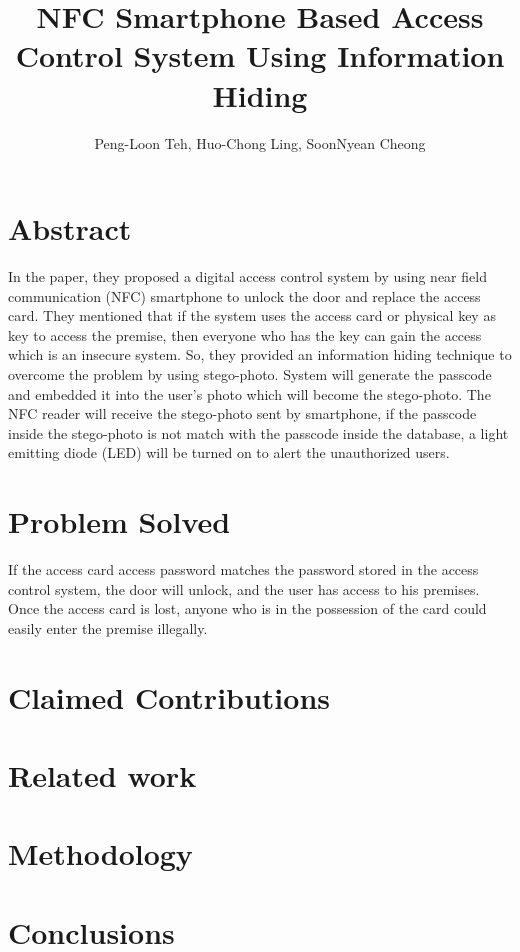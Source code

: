 \documentclass[•]{article}
\title{NFC Smartphone Based Access Control System Using Information Hiding}
\author{Peng-Loon Teh, Huo-Chong Ling, SoonNyean Cheong}
\date{}
\begin{document}

\tableofcontents
\maketitle

\section{Abstract}
\hspace{1cm}In the paper, they proposed a digital access control system by using near field communication (NFC) smartphone to unlock the door and replace the access card. They mentioned that if the system uses the access card or physical key as key to access the premise, then everyone who has the key can gain the access which is an insecure system. So, they provided an information hiding technique to overcome the problem by using stego-photo. System will generate the passcode and embedded it into the user’s photo which will become the stego-photo. The NFC reader will receive the stego-photo sent by smartphone, if the passcode inside the stego-photo is not match with the passcode inside the database, a light emitting diode (LED) will be turned on to alert the unauthorized users. ~\cite{Katzenbeisser2000}

\section{Problem Solved}
If the access card access password matches the password stored in the access control system, the door will unlock, and the user has access to his premises.
Once the access card is lost, anyone who is in the possession of the card could easily enter the premise illegally.

\section{Claimed Contributions}

\section{Related work}

\section{Methodology}

\section{Conclusions}


{}
\end{document}
